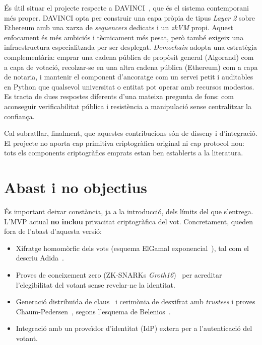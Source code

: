 És útil situar el projecte respecte a DAVINCI~\cite{vocdoni2026davinci}, que és el sistema contemporani més proper.
DAVINCI opta per construir una capa pròpia de tipus \emph{Layer 2} sobre Ethereum amb una xarxa de \emph{sequencers}
dedicats i un \emph{zkVM} propi.
Aquest enfocament és més ambiciós i tècnicament més pesat, però també exigeix una infraestructura especialitzada per ser
desplegat.
\emph{Demochain} adopta una estratègia complementària: emprar una cadena pública de propòsit general (Algorand) com a
capa de votació, recolzar-se en una altra cadena pública (Ethereum) com a capa de notaria, i mantenir el component
d'ancoratge com un servei petit i auditables en Python que qualsevol universitat o entitat pot operar amb recursos
modestos.
Es tracta de dues respostes diferents d'una mateixa pregunta de fons: com aconseguir verificabilitat pública i
resistència a manipulació sense centralitzar la confiança.

Cal subratllar, finalment, que aquestes contribucions són de disseny i d'integració.
El projecte no aporta cap primitiva criptogràfica original ni cap protocol nou: tots els components criptogràfics
emprats estan ben establerts a la literatura.



\section{Abast i no objectius}
\label{sec:abast}

És important deixar constància, ja a la introducció, dels límits del que s'entrega.
L'\ac{MVP} actual \textbf{no inclou} privacitat criptogràfica del vot.
Concretament, queden fora de l'abast d'aquesta versió:

\begin{itemize}
    \item Xifratge homomòrfic dels vots (esquema ElGamal exponencial~\cite{elgamal1985public}), tal com el descriu Adida~\cite{adida2008helios}.

    \item Proves de coneixement zero (\acsp{ZK-SNARK} \emph{Groth16})~\cite{goldwasser1989knowledge,groth2016size} per acreditar l'elegibilitat del votant sense
    revelar-ne la identitat.

    \item Generació distribuïda de claus~\cite{gennaro1999dkg} i cerimònia de desxifrat amb \emph{trustees} i proves Chaum-Pedersen~\cite{chaum1992wallet}, segons
    l'esquema de Belenios~\cite{cortier2019belenios}.

    \item Integració amb un proveïdor d'identitat (\ac{IdP}) extern per a l'autenticació del votant.
\end{itemize}

